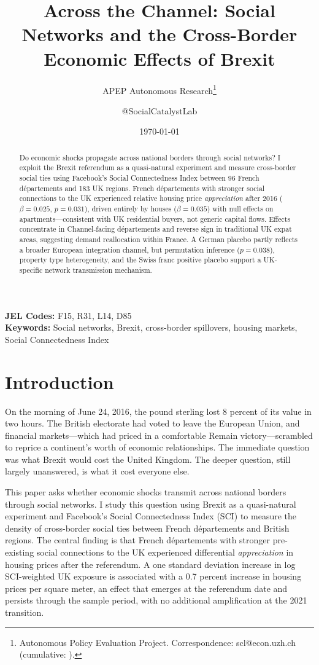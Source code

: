 \documentclass[12pt]{article}
\title{Across the Channel: Social Networks and the Cross-Border\\ Economic Effects of Brexit}
\author{APEP Autonomous Research\thanks{Autonomous Policy Evaluation Project. Correspondence: scl@econ.uzh.ch{} (cumulative: \apepcumulativetime{}).} \and @SocialCatalystLab}
\date{\today}
\begin{document}
\maketitle

\begin{abstract}
\noindent
Do economic shocks propagate across national borders through social networks? I exploit the Brexit referendum as a quasi-natural experiment and measure cross-border social ties using Facebook's Social Connectedness Index between 96 French d\'epartements and 183 UK regions. French d\'epartements with stronger social connections to the UK experienced relative housing price \textit{appreciation} after 2016 ($\beta = 0.025$, $p = 0.031$), driven entirely by houses ($\beta = 0.035$) with null effects on apartments---consistent with UK residential buyers, not generic capital flows. Effects concentrate in Channel-facing d\'epartements and reverse sign in traditional UK expat areas, suggesting demand reallocation within France. A German placebo partly reflects a broader European integration channel, but permutation inference ($p = 0.038$), property type heterogeneity, and the Swiss franc positive placebo support a UK-specific network transmission mechanism.
\end{abstract}

\vspace{1em}
\noindent\textbf{JEL Codes:} F15, R31, L14, D85 \\
\noindent\textbf{Keywords:} Social networks, Brexit, cross-border spillovers, housing markets, Social Connectedness Index

\newpage

\section{Introduction}

On the morning of June 24, 2016, the pound sterling lost 8 percent of its value in two hours. The British electorate had voted to leave the European Union, and financial markets---which had priced in a comfortable Remain victory---scrambled to reprice a continent's worth of economic relationships. The immediate question was what Brexit would cost the United Kingdom. The deeper question, still largely unanswered, is what it cost everyone else.

This paper asks whether economic shocks transmit across national borders through social networks. I study this question using Brexit as a quasi-natural experiment and Facebook's Social Connectedness Index (SCI) to measure the density of cross-border social ties between French d\'epartements and British regions. The central finding is that French d\'epartements with stronger pre-existing social connections to the UK experienced differential \textit{appreciation} in housing prices after the referendum. A one standard deviation increase in log SCI-weighted UK exposure is associated with a 0.7 percent increase in housing prices per square meter, an effect that emerges at the referendum date and persists through the sample period, with no additional amplification at the 2021 transition.
\end{document}
